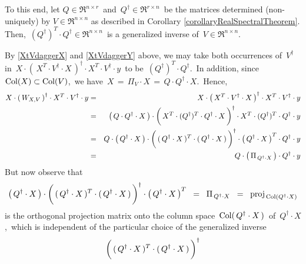 \begin{enumerate}
	To this end, let $Q \in \Re^{n \times r}$\, and \,$Q^{\dagger} \in \Re^{r \times n}$\,
	be the matrices determined (non-uniquely) by $V \in \Re^{n \times n}$
	as described in Corollary \ref{corollaryRealSpectralTheorem}.
	Then, \,$(Q^{\dagger})^{T} \cdot Q^{\dagger} \in \Re^{n \times n}$\,
	is a generalized inverse of \,$V \in \Re^{n \times n}$.

	By \eqref{XtVdaggerX} and \eqref{XtVdaggerY} above,
	we may take both occurrences of \,$V^{\dagger}$\, in
	\,$X \cdot \left(\,X^{T} \cdot V^{\dagger} \cdot X\,\right)^{\dagger} \cdot X^{T} \cdot V^{\dagger} \cdot y$\,
	to be	 \,$(Q^{\dagger})^{T} \cdot Q^{\dagger}$.\,
	In addition, since \,$\textnormal{Col}(X) \subset \textnormal{Col}(V)$,\, we have
	\,$X \,=\, \Pi_{V} \cdot X \,=\, Q \cdot Q^{\dagger} \cdot X$.\,
	Hence,
	\begin{eqnarray*}
	X \cdot \left(\,W_{X,V}\,\right)^{\dagger} \cdot X^{T} \cdot V^{\dagger} \cdot y
	&=&
		X \cdot \left(\,X^{T} \cdot V^{\dagger} \cdot X\,\right)^{\dagger} \cdot X^{T} \cdot V^{\dagger} \cdot y
	\\
	&=&
		\left(\,Q \cdot Q^{\dagger} \cdot X\,\right)
		\cdot
		\left(\,X^{T} \cdot (Q^{\dagger})^{T} \overset{{\color{white}\vert}}{\cdot} Q^{\dagger} \cdot X\,\right)^{\dagger}
		\cdot
		X^{T} \cdot (Q^{\dagger})^{T} \cdot Q^{\dagger} \cdot y
	\\
	&=&
		Q \cdot
		\left(\,Q^{\dagger} \cdot X\,\right)
		\cdot
		\left(\,(\,Q^{\dagger} \cdot X\,)^{T} \overset{{\color{white}\vert}}{\cdot} (\,Q^{\dagger} \cdot X\,)\,\right)^{\dagger}
		\cdot
		\left(\,Q^{\dagger} \cdot X\,\right)^{T}
		\cdot
		Q^{\dagger} \cdot y
	\\
	&=&
		Q \cdot
		\left(\,\Pi_{\,Q^{\dagger} \cdot X}\,\right)
		\cdot
		Q^{\dagger} \cdot y
	\end{eqnarray*}
	But now observe that
	\begin{equation*}
	\left(\,Q^{\dagger} \cdot X\,\right)
	\cdot
	\left(\,(\,Q^{\dagger} \cdot X\,)^{T} \overset{{\color{white}\vert}}{\cdot} (\,Q^{\dagger} \cdot X\,)\,\right)^{\dagger}
	\cdot
	\left(\,Q^{\dagger} \cdot X\,\right)^{T}
	\;\; = \;\;
		\Pi_{\,Q^{\dagger} \cdot X}
	\;\; = \;\;
		\proj_{\,\Col(Q^{\dagger} \cdot X)}
	\end{equation*}
	is the orthogonal projection matrix onto the column space
	\,$\textnormal{Col}(\,Q^{\dagger} \cdot X\,)$\, of \,$Q^{\dagger} \cdot X$,\,
	which is independent of the particular choice of the generalized inverse
	\begin{equation*}
	\left(\,(\,Q^{\dagger} \cdot X\,)^{T} \overset{{\color{white}\vert}}{\cdot} (\,Q^{\dagger} \cdot X\,)\,\right)^{\dagger}

\end{equation*}
\end{enumerate}
